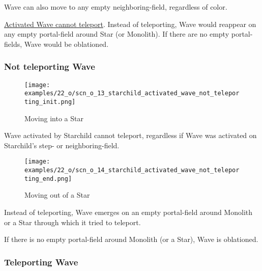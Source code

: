 Wave can also move to any empty neighboring-field, regardless of color.

\hyperref[fig:scn_o_13_starchild_activated_wave_not_teleporting_init]{Activated Wave cannot teleport}.
Instead of teleporting, Wave would reappear on any empty portal-field around Star (or Monolith).
If there are no empty portal-fields, Wave would be oblationed.

\clearpage %

\subsubsection*{Not teleporting Wave}

\noindent
\begin{wrapfigure}[4]{l}{0.4\textwidth}
\centering
\texttt{[image: examples/22\_o/scn\_o\_13\_starchild\_activated\_wave\_not\_teleporting\_init.png]}
\caption{Moving into a Star}
\label{fig:scn_o_13_starchild_activated_wave_not_teleporting_init}
\end{wrapfigure}
Wave activated by Starchild cannot teleport, regardless if Wave was activated on Starchild's
step- or neighboring-field.

\vspace*{7.1\baselineskip}
\noindent
\begin{wrapfigure}[7]{l}{0.4\textwidth}
\centering
\texttt{[image: examples/22\_o/scn\_o\_14\_starchild\_activated\_wave\_not\_teleporting\_end.png]}
\caption{Moving out of a Star}
\label{fig:scn_o_14_starchild_activated_wave_not_teleporting_end}
\end{wrapfigure}
Instead of teleporting, Wave emerges on an empty portal-field around Monolith or a Star through
which it tried to teleport.

If there is no empty portal-field around Monolith (or a Star), Wave is oblationed.

\clearpage %

\subsubsection*{Teleporting Wave}

